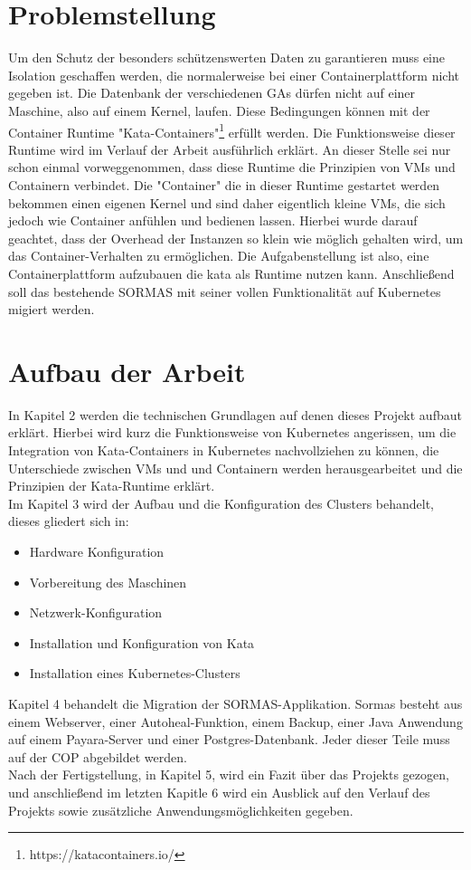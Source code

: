 \section{Problemstellung}
Um den Schutz der besonders schützenswerten Daten zu garantieren muss eine Isolation geschaffen werden, die normalerweise bei einer Containerplattform nicht gegeben ist. 
Die Datenbank der verschiedenen \ac{GAs} dürfen nicht auf einer Maschine, also auf einem Kernel, laufen.
Diese Bedingungen können mit der Container Runtime "Kata-Containers"\footnote{https://katacontainers.io/} erfüllt werden. 
Die Funktionsweise dieser Runtime wird im Verlauf der Arbeit ausführlich erklärt. 
An dieser Stelle sei nur schon einmal vorweggenommen, dass diese Runtime die Prinzipien von \ac{VM}s und Containern  verbindet. 
Die "Container" die in dieser Runtime gestartet werden bekommen einen eigenen Kernel und sind daher eigentlich kleine \ac{VM}s, die sich jedoch wie Container anfühlen und bedienen lassen.
Hierbei wurde darauf geachtet, dass der Overhead der Instanzen so klein wie möglich gehalten wird, um das Container-Verhalten zu ermöglichen.
Die Aufgabenstellung ist also, eine Containerplattform aufzubauen die kata als Runtime nutzen kann.
Anschließend soll das bestehende \ac{SORMAS} mit seiner vollen Funktionalität auf Kubernetes migiert werden.

\section{Aufbau der Arbeit}
In Kapitel 2 werden die technischen Grundlagen auf denen dieses Projekt aufbaut erklärt. 
Hierbei wird kurz die Funktionsweise von Kubernetes angerissen, um die Integration von Kata-Containers in Kubernetes nachvollziehen zu können,
die Unterschiede zwischen \ac{VM}s und und Containern werden herausgearbeitet und die Prinzipien der Kata-Runtime erklärt.
\\
Im Kapitel 3 wird der Aufbau und die Konfiguration des Clusters behandelt, dieses gliedert sich in:
\begin{itemize}
    \item Hardware Konfiguration
    \item Vorbereitung des Maschinen
    \item Netzwerk-Konfiguration
    \item Installation und Konfiguration von Kata
    \item Installation eines Kubernetes-Clusters
\end{itemize}

Kapitel 4 behandelt die Migration der \ac{SORMAS}-Applikation.
Sormas besteht aus einem Webserver, einer Autoheal-Funktion, einem Backup, einer Java Anwendung auf einem Payara-Server und einer Postgres-Datenbank.
Jeder dieser Teile muss auf der \ac{COP} abgebildet werden.
\\
Nach der Fertigstellung, in Kapitel 5, wird ein Fazit über das Projekts gezogen, und anschließend im letzten Kapitle 6 wird ein Ausblick auf den Verlauf des Projekts sowie zusätzliche Anwendungsmöglichkeiten gegeben.
